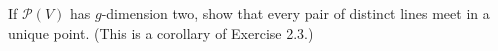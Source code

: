 If $\mathcal{P}(V)$ has $g$-dimension two, show that every pair of distinct lines meet in a unique point. (This is a corollary of Exercise 2.3.)

